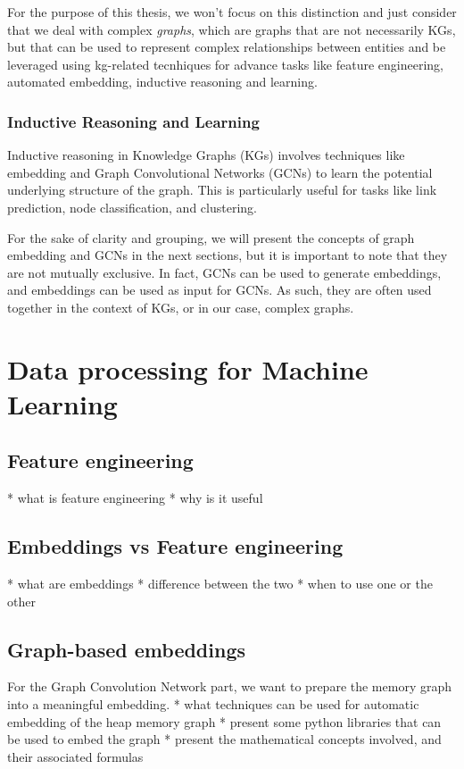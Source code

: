    For the purpose of this thesis, we won't focus on this distinction and just consider that we deal with complex \textit{graphs}, which are graphs that are not necessarily KGs, but that can be used to represent complex relationships between entities and be leveraged using \acrshort{kg}-related tecnhiques for advance tasks like feature engineering, automated embedding, inductive reasoning and learning.

    \subsubsection{Inductive Reasoning and Learning}
    Inductive reasoning in Knowledge Graphs (KGs) involves techniques like embedding and Graph Convolutional Networks (GCNs) to learn the potential underlying structure of the graph. This is particularly useful for tasks like link prediction, node classification, and clustering.

    For the sake of clarity and grouping, we will present the concepts of graph embedding and GCNs in the next sections, but it is important to note that they are not mutually exclusive. In fact, GCNs can be used to generate embeddings, and embeddings can be used as input for GCNs. As such, they are often used together in the context of KGs, or in our case, complex graphs.

\section{Data processing for Machine Learning}\label{sec:background:processing}

    \subsection{Feature engineering}
    * what is feature engineering
    * why is it useful

    \subsection{Embeddings vs Feature engineering}
    * what are embeddings
    * difference between the two
    * when to use one or the other

    \subsection{Graph-based embeddings}
    For the Graph Convolution Network part, we want to prepare the memory graph into a meaningful embedding.
    * what techniques can be used for automatic embedding of the heap memory graph
    * present some python libraries that can be used to embed the graph
    * present the mathematical concepts involved, and their associated formulas

